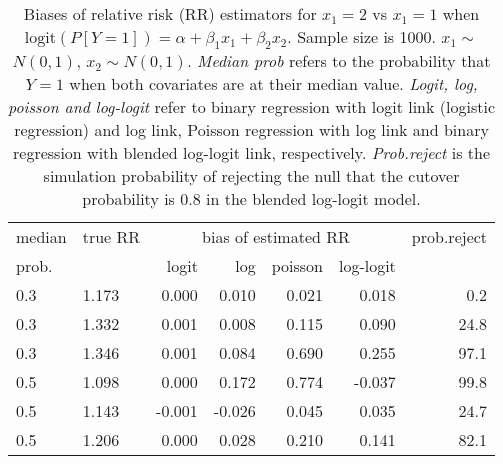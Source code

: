\documentclass[12pt,a4paper]{article}
\begin{document}
\begin{table}[H] 
\small\sf\centering 
\caption{Biases of relative risk (RR) estimators for $x_1=2$ vs $x_1=1$ when $\mbox{logit}(P[Y=1])=\alpha+\beta_1 x_1 + \beta_2 x_2$. Sample size is 1000. $x_1 \sim $$N(0,1)$, $x_2 \sim N(0,1)$. {\it Median prob} refers to the probability that $Y=1$ when both covariates are at their median value. {\it Logit, log, poisson and log-logit} refer to binary regression with logit link (logistic regression) and log link, Poisson regression with log link and binary regression with blended log-logit link, respectively. {\it Prob.reject} is the simulation probability of rejecting the null that the cutover probability is $0.8$ in the blended log-logit model.} 
\begin{tabular}{llrrrrr} 
\toprule 
median & true RR & \multicolumn{4}{c}{bias of estimated RR} & prob.reject \\ 
prob. & & logit & log & poisson & log-logit  & \\ \midrule 
0.3 & 1.173 &  0.000 &  0.010 & 0.021 &  0.018 &  0.2 \\  
0.3 & 1.332 &  0.001 &  0.008 & 0.115 &  0.090 & 24.8 \\  
0.3 & 1.346 &  0.001 &  0.084 & 0.690 &  0.255 & 97.1 \\  
0.5 & 1.098 &  0.000 &  0.172 & 0.774 & -0.037 & 99.8 \\  
0.5 & 1.143 & -0.001 & -0.026 & 0.045 &  0.035 & 24.7 \\  
0.5 & 1.206 &  0.000 &  0.028 & 0.210 &  0.141 & 82.1 \\  
\bottomrule 
\end{tabular} 
\end{table} 
\end{document}
